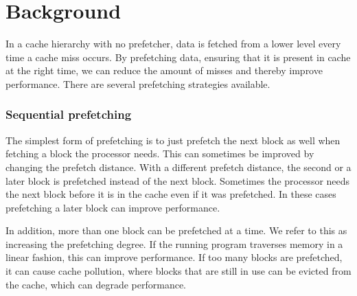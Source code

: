 \section{Background}
\label{sec:background}


In a cache hierarchy with no prefetcher, data is fetched from a lower level every time a cache miss occurs.
By prefetching data, ensuring that it is present in cache at the right time, we can reduce the amount of misses and thereby improve performance.
There are several prefetching strategies available.

\subsubsection{Sequential prefetching}

The simplest form of prefetching is to just prefetch the next block
as well when fetching a block the processor needs. This can
sometimes be improved by changing the prefetch distance. With a
different prefetch distance, the second or a later block is
prefetched instead of the next block.
Sometimes the processor needs the next block before it is in
the cache even if it was prefetched. In these cases prefetching a
later block can improve performance.

In addition, more than one block can be prefetched at a time.
We refer to this as increasing the prefetching degree. If the
running program traverses memory in a linear fashion, this can
improve performance. If too many blocks are prefetched, it can cause cache pollution, where blocks that
are still in use can be evicted from the cache, which can degrade performance.

